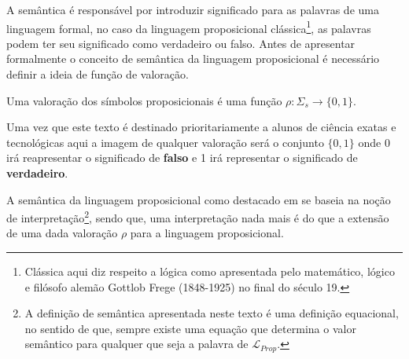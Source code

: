 A semântica é responsável por introduzir significado para as palavras de uma linguagem formal, no caso da linguagem proposicional clássica\footnote{Clássica aqui diz respeito a lógica como apresentada pelo  matemático, lógico e filósofo alemão Gottlob Frege (1848-1925) no final do século 19.}, as palavras podem ter seu significado como verdadeiro ou falso. Antes de apresentar formalmente o conceito de semântica da linguagem proposicional é necessário definir a ideia de função de  valoração.

\begin{definition}[Valoração]
   Uma valoração dos símbolos proposicionais é uma função $\rho : \Sigma_s \rightarrow \{0,1\}$.
\end{definition}

\begin{rema}
    Uma vez que este texto é destinado prioritariamente a alunos de ciência exatas e tecnológicas aqui a imagem de qualquer valoração será o conjunto $\{0,1\}$ onde $0$ irá reapresentar o significado de \textbf{falso} e 1 irá representar o significado de \textbf{verdadeiro}.
\end{rema}

A semântica da linguagem proposicional como destacado em \cite{joaoPavao2014} se baseia na noção de interpretação\footnote{A definição de semântica apresentada neste texto é uma definição equacional, no sentido de que, sempre existe uma equação que determina o valor semântico para qualquer que seja a palavra de $\mathcal{L}_{Prop}$.}, sendo que, uma interpretação nada mais é do que a extensão de uma dada valoração $\rho$ para a linguagem proposicional.

